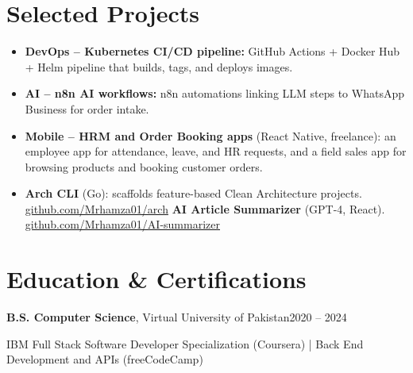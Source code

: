 \documentclass[letterpaper,10pt]{article}
\begin{document}
\section{Selected Projects}
\begin{itemize}
  \item \textbf{DevOps -- Kubernetes CI/CD pipeline:} GitHub Actions + Docker Hub + Helm pipeline that builds, tags, and deploys images.
  \item \textbf{AI -- n8n AI workflows:} n8n automations linking LLM steps to WhatsApp Business for order intake.
  \item \textbf{Mobile -- HRM and Order Booking apps} (React Native, freelance): an employee app for attendance,
        leave, and HR requests, and a field sales app for browsing products and booking customer orders.
  \item \textbf{Arch CLI} (Go): scaffolds feature-based Clean Architecture projects.
        \href{https://github.com/Mrhamza01/arch}{github.com/Mrhamza01/arch} \quad
        \textbf{AI Article Summarizer} (GPT-4, React).
        \href{https://github.com/Mrhamza01/AI-summarizer}{github.com/Mrhamza01/AI-summarizer}
\end{itemize}

\section{Education \& Certifications}
\textbf{B.S. Computer Science}, Virtual University of Pakistan\hfill 2020 -- 2024\par
IBM Full Stack Software Developer Specialization (Coursera) | Back End Development and APIs (freeCodeCamp)
\end{document}
